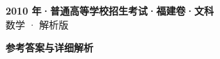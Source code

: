 \documentclass[zihao=-4, a4paper]{ctexart}
\begin{document}
\begin{center}
  {\Large\bfseries 2010 年·普通高等学校招生考试·福建卷·文科}\\[4pt]
  {\large 数学 · 解析版}
\end{center}
\medskip
{}

\clearpage
{}
\begin{center}{\Large\bfseries 参考答案与详细解析}\end{center}
\medskip

\end{document}
